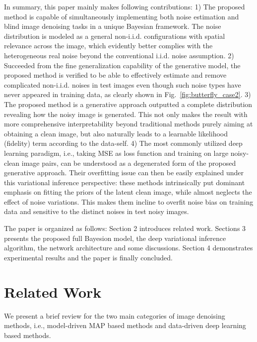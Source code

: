 \documentclass{article}
\begin{document}
In summary, this paper mainly makes following contributions: 1) The proposed method is capable of simultaneously
implementing both noise estimation and blind image denoising tasks in a unique Bayesian framework.
The noise distribution is modeled as a general non-i.i.d. configurations with spatial relevance across the image,
which evidently better complies with the heterogeneous real noise beyond the conventional i.i.d. noise assumption.
2) Succeeded from the fine generalization capability of the generative model, the proposed method is verified to
be able to effectively estimate and remove complicated non-i.i.d. noises in test images even though such noise types
have never appeared in training data, as clearly shown in Fig.~\ref{fig:butterfly_case2}. 3) The proposed method is
a generative approach outputted a complete distribution revealing how the noisy image is generated. This not only
makes the result with more comprehensive interpretability beyond traditional methods purely aiming at obtaining
a clean image, but also naturally leads to a learnable likelihood (fidelity) term according to the data-self. 4) The
most commonly utilized deep learning paradigm, i.e., taking MSE as loss function and training on large noisy-clean
image pairs, can be understood as a degenerated form of the proposed generative approach. Their overfitting issue
can then be easily explained under this variational inference perspective: these methods intrinsically put dominant
emphasis on fitting the priors of the latent clean image, while almost neglects the effect of noise variations. This
makes them incline to overfit noise bias on training data and sensitive to the distinct noises in test noisy images.

The paper is organized as follows: Section 2 introduces related work. Sections 3 presents the 
proposed full Bayesion model,
the deep variational inference algorithm, the network architecture and some discussions. Section 4
demonstrates experimental results and the paper is finally concluded.

\vspace{-3mm}\section{Related Work}\vspace{-3mm}
We present a brief review for the two main categories of image denoising methods, i.e., model-driven MAP based methods
and data-driven deep learning based methods.
\end{document}
